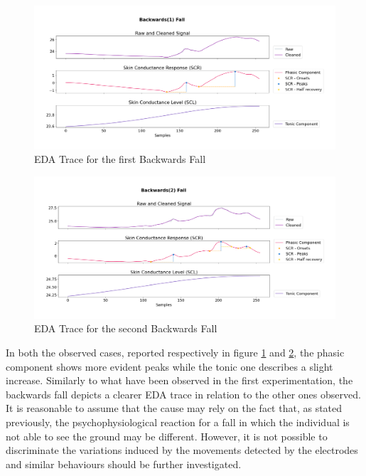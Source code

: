 \begin{figure}[h!]
    \centering
    \includegraphics[width=\textwidth]{./images/movisens/Backwards1.png}
    \caption{EDA Trace for the first Backwards Fall}
    \label{fig:movisens-backwards1}
\end{figure}

\begin{figure}[h!]
    \centering
    \includegraphics[width=\textwidth]{./images/movisens/Backwards2.png}
    \caption{EDA Trace for the second Backwards Fall}
    \label{fig:movisens-backwards2}
\end{figure}

In both the observed cases, reported respectively in figure \ref{fig:movisens-backwards1} and \ref{fig:movisens-backwards2}, the phasic component shows more evident peaks while the tonic one describes a slight increase. Similarly to what have been observed in the first experimentation, the backwards fall depicts a clearer EDA trace in relation to the other ones observed. It is reasonable to assume that the cause may rely on the fact that, as stated previously, the psychophysiological reaction for a fall in which the individual is not able to see the ground may be different. However, it is not possible to discriminate the variations induced by the movements detected by the electrodes and similar behaviours should be further investigated.

